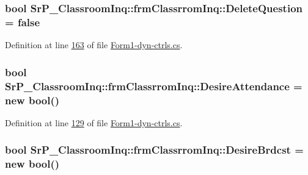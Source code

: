 \hypertarget{class_sr_p___classroom_inq_1_1frm_classrrom_inq_ab3a8803fac827da5757e7451c1836010}{
\subsubsection[{\-Delete\-Question}]{\setlength{\rightskip}{0pt plus 5cm}bool {\bf \-Sr\-P\-\_\-\-Classroom\-Inq\-::frm\-Classrrom\-Inq\-::\-Delete\-Question} = false}}
\label{class_sr_p___classroom_inq_1_1frm_classrrom_inq_ab3a8803fac827da5757e7451c1836010}


\-Definition at line \hyperlink{_form1-dyn-ctrls_8cs_source_l00163}{163} of file \hyperlink{_form1-dyn-ctrls_8cs_source}{\-Form1-\/dyn-\/ctrls.\-cs}.

\hypertarget{class_sr_p___classroom_inq_1_1frm_classrrom_inq_a2f4a98083518f487399985a1b76d44b5}{
\subsubsection[{\-Desire\-Attendance}]{\setlength{\rightskip}{0pt plus 5cm}bool {\bf \-Sr\-P\-\_\-\-Classroom\-Inq\-::frm\-Classrrom\-Inq\-::\-Desire\-Attendance} = new bool()}}
\label{class_sr_p___classroom_inq_1_1frm_classrrom_inq_a2f4a98083518f487399985a1b76d44b5}


\-Definition at line \hyperlink{_form1-dyn-ctrls_8cs_source_l00129}{129} of file \hyperlink{_form1-dyn-ctrls_8cs_source}{\-Form1-\/dyn-\/ctrls.\-cs}.

\hypertarget{class_sr_p___classroom_inq_1_1frm_classrrom_inq_ab67298a2e18c70080e8cc5e604223679}{
\subsubsection[{\-Desire\-Brdcst}]{\setlength{\rightskip}{0pt plus 5cm}bool {\bf \-Sr\-P\-\_\-\-Classroom\-Inq\-::frm\-Classrrom\-Inq\-::\-Desire\-Brdcst} = new bool()}}
\label{class_sr_p___classroom_inq_1_1frm_classrrom_inq_ab67298a2e18c70080e8cc5e604223679}


